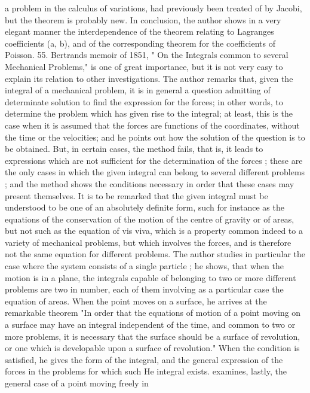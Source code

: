 \documentclass[12pt,a4paper]{article}
\theoremstyle{definition}
\begin{document}

a problem in the calculus of variations, had previously been treated of by Jacobi, but
the theorem is probably new. In conclusion, the author shows in a very elegant
manner the interdependence of the theorem relating to Lagranges coefficients (a, b),
and of the corresponding theorem for the coefficients of Poisson.
55. Bertrands memoir of 1851, " On the Integrals common to several Mechanical
Problems," is one of great importance, but it is not very easy to explain its relation
to other investigations. The author remarks that, given the integral of a mechanical
problem, it is in general a question admitting of determinate solution to find the
expression for the forces; in other words, to determine the problem which has given
rise to the integral; at least, this is the case when it is assumed that the forces
are functions of the coordinates, without the time or the velocities; and he points out
how the solution of the question is to be obtained. But, in certain cases, the method
fails, that is, it leads to expressions which are not sufficient for the determination of
the forces ; these are the only cases in which the given integral can belong to
several different problems ; and the method shows the conditions necessary in order that
these cases may present themselves. It is to be remarked that the given integral must
be understood to be one of an absolutely definite form, such for instance as the
equations of the conservation of the motion of the centre of gravity or of areas, but
not such as the equation of vis viva, which is a property common indeed to a variety
of mechanical problems, but which involves the forces, and is therefore not the same
equation for different problems. The author studies in particular the case where the
system consists of a single particle ; he shows, that when the motion is in a plane,
the integrals capable of belonging to two or more different problems are two in
number, each of them involving as a particular case the equation of areas. When
the point moves on a surface, he arrives at the remarkable theorem "In order that
the equations of motion of a point moving on a surface may have an
integral
independent of the time, and common to two or more problems, it is necessary that
the surface should be a surface of revolution, or one which is developable upon a
surface of revolution." When the condition is satisfied, he gives the form of the
integral, and the general expression of the forces in the problems for which such
He
integral exists. examines, lastly, the general case of a point moving freely in
\end{document}
